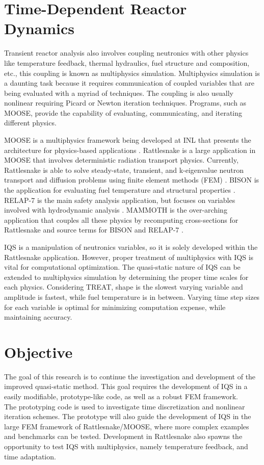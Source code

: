 \section{Time-Dependent Reactor Dynamics}

Transient reactor analysis also involves coupling neutronics with other physics like temperature feedback, thermal hydraulics, fuel structure and composition, etc., this coupling is known as multiphysics simulation. Multiphysics simulation is a daunting task because it requires communication of coupled variables that are being evaluated with a myriad of techniques. The coupling is also usually nonlinear requiring Picard or Newton iteration techniques. Programs, such as MOOSE, provide the capability of evaluating, communicating, and iterating different physics.

MOOSE is a multiphysics framework being developed at INL that presents the architecture for physics-based applications \cite{moose}.  Rattlesnake is a large application in MOOSE that involves deterministic radiation transport physics.  Currently, Rattlesnake is able to solve steady-state, transient, and k-eigenvalue neutron transport and diffusion problems using finite element methods (FEM) \cite{wang2013}. BISON is the application for evaluating fuel temperature and structural properties \cite{bison}.  RELAP-7 is the main safety analysis application, but focuses on variables involved with hydrodynamic analysis \cite{relap7}.  MAMMOTH is the over-arching application that couples all these physics by recomputing cross-sections for Rattlesnake and source terms for BISON and RELAP-7 \cite{mammoth}.

IQS is a manipulation of neutronics variables, so it is solely developed within the Rattlesnake application. However, proper treatment of multiphysics with IQS is vital for computational optimization.  The quasi-static nature of IQS can be extended to multiphysics simulation by determining the proper time scales for each physics.  Considering TREAT, shape is the slowest varying variable and amplitude is fastest, while fuel temperature is in between.  Varying time step sizes for each variable is optimal for minimizing computation expense, while maintaining accuracy.

\section{Objective}

The goal of this research is to continue the investigation and development of the improved quasi-static method.  This goal requires the development of IQS in a easily modifiable, prototype-like code, as well as a robust FEM framework. \\
\indent The prototyping code is used to investigate time discretization and nonlinear iteration schemes. The prototype will also guide the development of IQS in the large FEM framework of Rattlesnake/MOOSE, where more complex examples and benchmarks can be tested.  Development in Rattlesnake also spawns the opportunity to test IQS with multiphysics, namely temperature feedback, and time adaptation.

